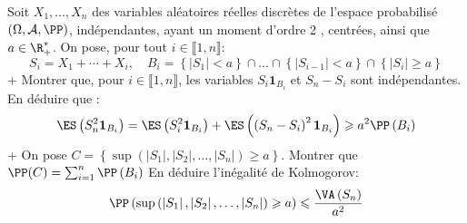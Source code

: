 \begin{exercise}[title=Inégalité de Kolmogorov]
Soit $X_{1}, \ldots, X_{n}$ des variables aléatoires réelles discrètes de l'espace probabilisé $(\Omega, \mathcal{A}, \PP)$, indépendantes, ayant un moment d'ordre 2 , centrées, ainsi que $a \in \R_{+}^{*}$. On pose, pour tout $i \in \llbracket 1, n \rrbracket:$
\begin{equation*}
S_{i}=X_{1}+\cdots+X_{i}, \quad B_{i}=\left\{\left|S_{1}\right|<a\right\} \cap \ldots \cap\left\{\left|S_{i-1}\right|<a\right\} \cap\left\{\left|S_{i}\right| \geqslant a\right\}
\end{equation*}
\question+ Montrer que, pour $i \in \llbracket 1, n \rrbracket$, les variables $S_{i} \mathbf{1}_{B_{i}}$ et $S_{n}-S_{i}$ sont indépendantes. En déduire que :
\begin{equation*}
\ES\left(S_{n}^{2} \mathbf{1}_{B_{i}}\right)=\ES\left(S_{i}^{2} \mathbf{1}_{B_{i}}\right)+\ES\left(\left(S_{n}-S_{i}\right)^{2} \mathbf{1}_{B_{i}}\right) \geqslant a^{2} \PP\left(B_{i}\right)
\end{equation*}
\question\question+ On pose $C=\left\{\sup \left(\left|S_{1}\right|,\left|S_{2}\right|, \ldots,\left|S_{n}\right|\right) \geqslant a\right\}$.
Montrer que $\PP(C)=\sum_{i=1}^{n} \PP\left(B_{i}\right)$
\question En déduire l'inégalité de Kolmogorov:
\begin{equation*}
\PP\left(\sup \left(\left|S_{1}\right|,\left|S_{2}\right|, \ldots,\left|S_{n}\right|\right) \geqslant a\right) \leqslant \frac{\VA\left(S_{n}\right)}{a^{2}}
\end{equation*}
\endquestions 
\end{exercise}

